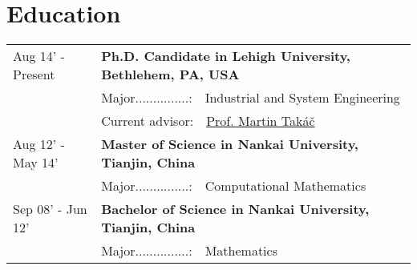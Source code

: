 \documentclass[a4paper,11pt]{article} %
\begin{document}
\section{Education}
\begin{longtable}{>{\centering}p{3.3cm}|p{14cm}}    
Aug 14' - Present &  \textbf{Ph.D. Candidate in Lehigh University, Bethlehem, PA, USA}   \\
&Major...............:~~Industrial and System Engineering \\
&Current advisor:~~\href{http://mtakac.com/}{Prof. Martin Takáč} \\
Aug 12' - May 14'&  \textbf{Master of Science in Nankai University, Tianjin, China} \\
&Major...............:~~Computational Mathematics\\
Sep 08' - Jun 12' & \normalsize\textbf{Bachelor of Science in Nankai University, Tianjin, China} \\
&Major...............:~~Mathematics \\
\end{longtable}

\end{document}
